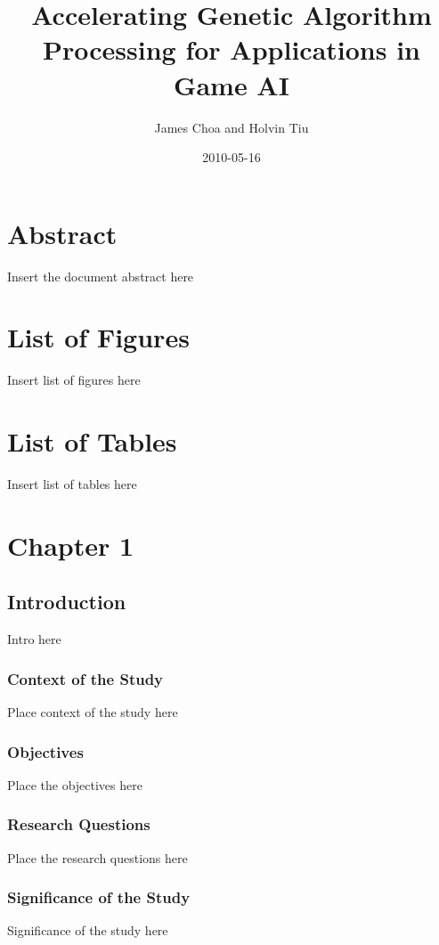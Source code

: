 \documentclass[letterpaper,10pt,titlepage]{article}
\author{James Choa and Holvin Tiu}
\title{Accelerating Genetic Algorithm Processing for Applications in Game AI}
\date{2010-05-16}
\begin{document}
\maketitle

\section*{Abstract}
Insert the document abstract here
\pagebreak

\tableofcontents


\section*{List of Figures}
Insert list of figures here



\section*{List of Tables}
Insert list of tables here



\section*{Chapter 1}
\subsection*{Introduction}
Intro here


\subsubsection*{Context of the Study}
Place context of the study here


\subsubsection*{Objectives}
Place the objectives here


\subsubsection*{Research Questions}
Place the research questions here


\subsubsection*{Significance of the Study}
Significance of the study here
\end{document}
